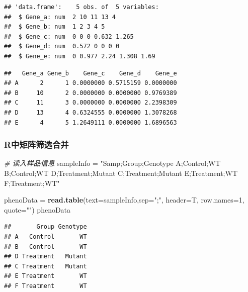 \documentclass[]{article}
\newenvironment{Shaded}{\begin{snugshade}}{\end{snugshade}}
\newcommand{\KeywordTok}[1]{\textcolor[rgb]{0.13,0.29,0.53}{\textbf{{#1}}}}
\newcommand{\DataTypeTok}[1]{\textcolor[rgb]{0.13,0.29,0.53}{{#1}}}
\newcommand{\DecValTok}[1]{\textcolor[rgb]{0.00,0.00,0.81}{{#1}}}
\newcommand{\StringTok}[1]{\textcolor[rgb]{0.31,0.60,0.02}{{#1}}}
\newcommand{\CommentTok}[1]{\textcolor[rgb]{0.56,0.35,0.01}{\textit{{#1}}}}
\newcommand{\NormalTok}[1]{{#1}}
\numberwithin{figure}{section}
\numberwithin{table}{section}
\theoremstyle{definition}
\theoremstyle{definition}
\theoremstyle{definition}
\theoremstyle{remark}
\begin{document}
\begin{verbatim}
## 'data.frame':    5 obs. of  5 variables:
##  $ Gene_a: num  2 10 11 13 4
##  $ Gene_b: num  1 2 3 4 5
##  $ Gene_c: num  0 0 0 0.632 1.265
##  $ Gene_d: num  0.572 0 0 0 0
##  $ Gene_e: num  0 0.977 2.24 1.308 1.69
\end{verbatim}

\begin{Shaded}
\end{Shaded}

\begin{verbatim}
##   Gene_a Gene_b    Gene_c    Gene_d    Gene_e
## A      2      1 0.0000000 0.5715159 0.0000000
## B     10      2 0.0000000 0.0000000 0.9769389
## C     11      3 0.0000000 0.0000000 2.2398309
## D     13      4 0.6324555 0.0000000 1.3078268
## E      4      5 1.2649111 0.0000000 1.6896563
\end{verbatim}

\subsubsection{R中矩阵筛选合并}\label{r}

\begin{Shaded}
\begin{Highlighting}[]
\CommentTok{# 读入样品信息}
\NormalTok{sampleInfo =}\StringTok{ "Samp;Group;Genotype}
\StringTok{A;Control;WT}
\StringTok{B;Control;WT}
\StringTok{D;Treatment;Mutant}
\StringTok{C;Treatment;Mutant}
\StringTok{E;Treatment;WT}
\StringTok{F;Treatment;WT"}

\NormalTok{phenoData =}\StringTok{ }\KeywordTok{read.table}\NormalTok{(}\DataTypeTok{text=}\NormalTok{sampleInfo,}\DataTypeTok{sep=}\StringTok{";"}\NormalTok{, }\DataTypeTok{header=}\NormalTok{T, }\DataTypeTok{row.names=}\DecValTok{1}\NormalTok{, }\DataTypeTok{quote=}\StringTok{""}\NormalTok{)}
\NormalTok{phenoData}
\end{Highlighting}
\end{Shaded}

\begin{verbatim}
##       Group Genotype
## A   Control       WT
## B   Control       WT
## D Treatment   Mutant
## C Treatment   Mutant
## E Treatment       WT
## F Treatment       WT
\end{verbatim}
\end{document}
